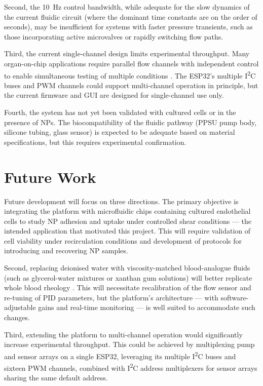 Second, the \SI{10}{\hertz} control bandwidth, while adequate for the slow dynamics of the current fluidic circuit (where the dominant time constants are on the order of seconds), may be insufficient for systems with faster pressure transients, such as those incorporating active microvalves or rapidly switching flow paths.

Third, the current single-channel design limits experimental throughput. Many organ-on-chip applications require parallel flow channels with independent control to enable simultaneous testing of multiple conditions \citep{Bhatia2014, Sosa-Hernandez2018}. The ESP32's multiple I\textsuperscript{2}C buses and PWM channels could support multi-channel operation in principle, but the current firmware and GUI are designed for single-channel use only.

Fourth, the system has not yet been validated with cultured cells or in the presence of NPs. The biocompatibility of the fluidic pathway (PPSU pump body, silicone tubing, glass sensor) is expected to be adequate based on material specifications, but this requires experimental confirmation.

\section{Future Work}

Future development will focus on three directions. The primary objective is integrating the platform with microfluidic chips containing cultured endothelial cells to study NP adhesion and uptake under controlled shear conditions --- the intended application that motivated this project. This will require validation of cell viability under recirculation conditions and development of protocols for introducing and recovering NP samples.

Second, replacing deionised water with viscosity-matched blood-analogue fluids (such as glycerol-water mixtures or xanthan gum solutions) will better replicate whole blood rheology \citep{Popel2005}. This will necessitate recalibration of the flow sensor and re-tuning of PID parameters, but the platform's architecture --- with software-adjustable gains and real-time monitoring --- is well suited to accommodate such changes.

Third, extending the platform to multi-channel operation would significantly increase experimental throughput. This could be achieved by multiplexing pump and sensor arrays on a single ESP32, leveraging its multiple I\textsuperscript{2}C buses and sixteen PWM channels, combined with I\textsuperscript{2}C address multiplexers for sensor arrays sharing the same default address.
